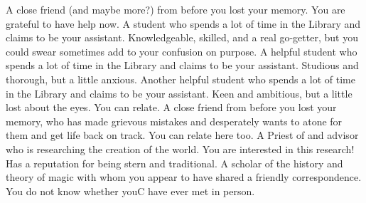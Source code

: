 \documentclass[char]{GL2020}
\begin{document}
\begin{contacts}
    \contact{\cInterpol{}} A close friend (and maybe more?) from before you lost your memory. You are grateful to have \cInterpol{\their} help now.
    \contact{\cLibAssist{}} A student who spends a lot of time in the Library and claims to be your assistant. Knowledgeable, skilled, and a real go-getter, but you could swear \cLibAssist{\they} sometimes add to your confusion on purpose.
    \contact{\cPresident{}} A helpful student who spends a lot of time in the Library and claims to be your assistant. Studious and thorough, but a little anxious.
    \contact{\cAmbition{}} Another helpful student who spends a lot of time in the Library and claims to be your assistant. Keen and ambitious, but a little lost about the eyes. You can relate.
    \contact{\cChupAvenger{}} A close friend from before you lost your memory, who has made grievous mistakes and desperately wants to atone for them and get \cChupAvenger{\their} life back on track. You can relate here too.
    \contact{\cEbbPriest{}} A Priest of \cEbb{} and \pShippie{} advisor who is researching the creation of the world. You are interested in this research! Has a reputation for being stern and traditional.
    \contact{\cWildCard{}} A scholar of the history and theory of magic with whom you appear to have shared a friendly correspondence. You do not know whether youC have ever met in person.
\end{contacts}
\end{document}
